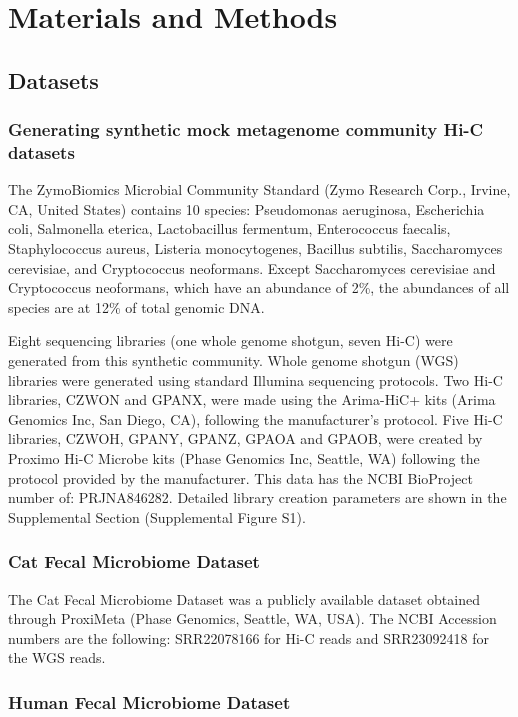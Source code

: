 \documentclass[fleqn,10pt,lineno]{wlpeerj}
\begin{document}
\section*{Materials and Methods}

\subsection*{Datasets}

\subsubsection*{Generating synthetic mock metagenome community Hi-C datasets}

The ZymoBiomics Microbial Community Standard (Zymo Research Corp., Irvine, CA, United States) contains 10 species: Pseudomonas aeruginosa, Escherichia coli, Salmonella eterica, Lactobacillus fermentum, Enterococcus faecalis, Staphylococcus aureus, Listeria monocytogenes, Bacillus subtilis, Saccharomyces cerevisiae, and Cryptococcus neoformans. Except Saccharomyces cerevisiae and Cryptococcus neoformans, which have an abundance of 2\%, the abundances of all species are at 12\% of total genomic DNA.

Eight sequencing libraries (one whole genome shotgun, seven Hi-C) were generated from this synthetic community. Whole genome shotgun  (WGS)  libraries were generated using standard Illumina sequencing protocols. Two Hi-C libraries, CZWON and GPANX, were made using the Arima-HiC+ kits (Arima Genomics Inc, San Diego, CA), following the manufacturer's protocol. Five Hi-C libraries, CZWOH, GPANY, GPANZ, GPAOA and GPAOB, were created by Proximo Hi-C Microbe kits (Phase Genomics Inc, Seattle, WA) following the protocol provided by the manufacturer. This data has the NCBI BioProject number of: PRJNA846282. Detailed library creation parameters are shown in the Supplemental Section (Supplemental Figure S1).

\subsubsection*{Cat Fecal Microbiome Dataset} 

The Cat Fecal Microbiome Dataset was a publicly available dataset obtained through ProxiMeta (Phase Genomics, Seattle, WA, USA). The NCBI Accession numbers are the following: SRR22078166 for Hi-C reads and SRR23092418 for the WGS reads.

\subsubsection*{Human Fecal Microbiome Dataset}
\end{document}
